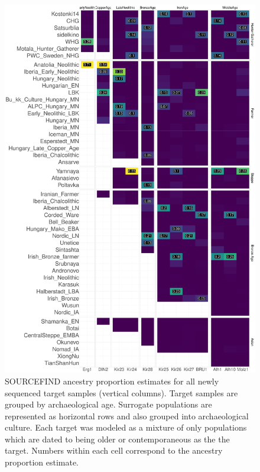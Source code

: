 \begin{figure}[htp]
    \centering
    \includegraphics[width=1.0\textwidth]{../images/chapter4/SOURCEFINDheatmapOlderSurrogates_2.pdf}
    \caption{SOURCEFIND ancestry proportion estimates for all newly sequenced target samples (vertical columns). Target samples are grouped by archaeological age. Surrogate populations are represented as horizontal rows and also grouped into archaeological culture. Each target was modeled as a mixture of only populations which are dated to being older or contemporaneous as the the target. Numbers within each cell correspond to the ancestry proportion estimate.}
    \label{fig:chapter4resultsSFheatmapolder}
\end{figure}

